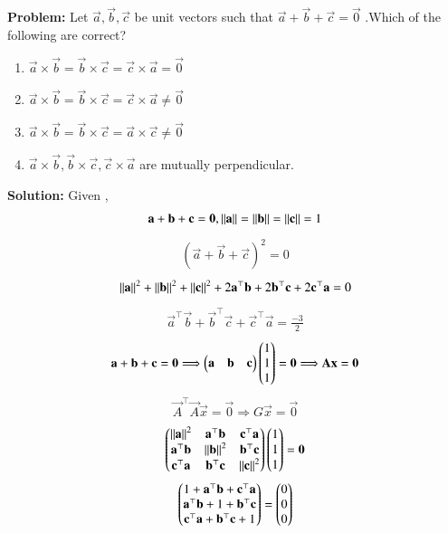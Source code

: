 \documentclass[journal]{IEEEtran}
\begin{document}
\textbf{Problem:} Let $\vec{a},\vec{b},\vec{c} $ be unit vectors such that $\vec{a}+\vec{b}+\vec{c} = \vec{0} $ .Which of the following are correct?
\begin{enumerate}
\item $ \vec{a}\times\vec{b} = \vec{b}\times\vec{c} = \vec{c}\times\vec{a} = \vec{0} $
\item $ \vec{a}\times\vec{b} = \vec{b}\times\vec{c} = \vec{c}\times\vec{a} \neq \vec{0} $
\item $ \vec{a}\times\vec{b} = \vec{b}\times\vec{c} = \vec{a}\times\vec{c} \neq \vec{0} $
\item $ \vec{a}\times\vec{b},\vec{b}\times\vec{c},\vec{c}\times\vec{a} $ are mutually perpendicular.
\end{enumerate}
\textbf{Solution:}
Given ,
\begin{align}
\mathbf{a}+\mathbf{b}+\mathbf{c} = \mathbf{0} , \left\lVert\mathbf{a}\right\rVert = \left\lVert\mathbf{b}\right\rVert = \left\lVert\mathbf{c}\right\rVert = 1
\end{align}
\begin{align}
(\vec{a}+\vec{b}+\vec{c})^2 = 0
\end{align}
\begin{align}
{\left\lVert\mathbf{a}\right\rVert}^2+{\left\lVert\mathbf{b}\right\rVert}^2+{\left\lVert\mathbf{c}\right\rVert}^2+2\mathbf{a}^\top\mathbf{b}+2\mathbf{b}^\top\mathbf{c}+2\mathbf{c}^\top\mathbf{a} = 0
\end{align}
\begin{align}
\vec{a}^\top\vec{b}+\vec{b}^\top\vec{c}+\vec{c}^\top\vec{a} = \frac{-3}{2}
\end{align}
\begin{align}
\mathbf{a}+\mathbf{b}+\mathbf{c}=\mathbf{0} \Longrightarrow \begin{pmatrix}\mathbf{a} & \mathbf{b} & \mathbf{c}\end{pmatrix}\begin{pmatrix}1 \\1\\1\end{pmatrix} = \mathbf{0} \Longrightarrow
\mathbf{A}\mathbf{x} = \mathbf{0} 
\end{align}
\begin{align}
\vec{A}^\top\vec{A}\vec{x} = \vec{0} \Longrightarrow G\vec{x}=\vec{0}
\end{align}
\begin{align}
\begin{pmatrix}
\left\lVert\mathbf{a}\right\rVert^2 & \mathbf{a}^\top\mathbf{b} & \mathbf{c}^\top\mathbf{a} \\
\mathbf{a}^\top\mathbf{b} & \left\lVert\mathbf{b}\right\rVert^2 & \mathbf{b}^\top\mathbf{c} \\
\mathbf{c}^\top\mathbf{a} & \mathbf{b}^\top\mathbf{c} & \left\lVert\mathbf{c}\right\rVert^2 \end{pmatrix}
\begin{pmatrix}
1 \\ 1 \\ 1\end{pmatrix} = \mathbf{0}
\end{align}
\begin{align}
\begin{pmatrix}
1+\mathbf{a}^\top\mathbf{b}+\mathbf{c}^\top\mathbf{a} \\
\mathbf{a}^\top\mathbf{b}+1+\mathbf{b}^\top\mathbf{c} \\
\mathbf{c}^\top\mathbf{a}+\mathbf{b}^\top\mathbf{c}+1\end{pmatrix} = \begin{pmatrix}0 \\ 0 \\ 0\end{pmatrix}
\end{align}
\end{document}
